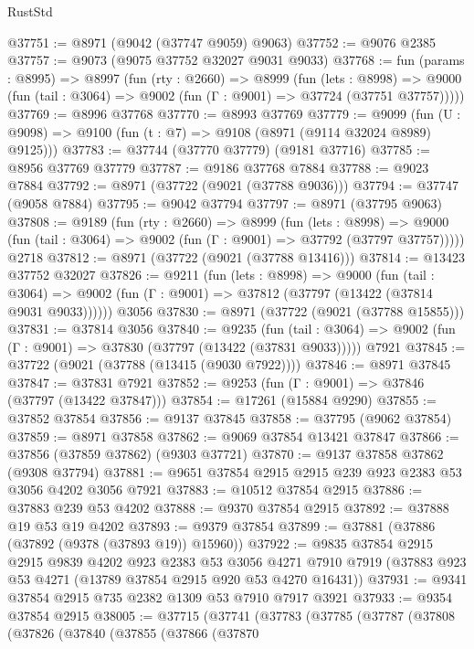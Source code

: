 \begin{lexlean}{RustStd}
\begin{coremodule}
@37751 := @8971 (@9042 (@37747 @9059) @9063)
@37752 := @9076 @2385
@37757 := @9073 (@9075 @37752 @32027 @9031 @9033)
@37768 := fun (params : @8995) =>
  @8997
    (fun (rty : @2660) =>
    @8999
      (fun (lets : @8998) =>
      @9000 (fun (tail : @3064) => @9002 (fun (Γ : @9001) => @37724 (@37751 @37757)))))
@37769 := @8996 @37768
@37770 := @8993 @37769
@37779 := @9099
    (fun (U : @9098) => @9100 (fun (t : @7) => @9108 (@8971 (@9114 @32024 @8989) @9125)))
@37783 := @37744 (@37770 @37779) (@9181 @37716)
@37785 := @8956 @37769 @37779
@37787 := @9186 @37768 @7884
@37788 := @9023 @7884
@37792 := @8971 (@37722 (@9021 (@37788 @9036)))
@37794 := @37747 (@9058 @7884)
@37795 := @9042 @37794
@37797 := @8971 (@37795 @9063)
@37808 := @9189
    (fun (rty : @2660) =>
    @8999
      (fun (lets : @8998) =>
      @9000 (fun (tail : @3064) => @9002 (fun (Γ : @9001) => @37792 (@37797 @37757)))))
    @2718
@37812 := @8971 (@37722 (@9021 (@37788 @13416)))
@37814 := @13423 @37752 @32027
@37826 := @9211
    (fun (lets : @8998) =>
    @9000
      (fun (tail : @3064) =>
      @9002 (fun (Γ : @9001) => @37812 (@37797 (@13422 (@37814 @9031 @9033))))))
    @3056
@37830 := @8971 (@37722 (@9021 (@37788 @15855)))
@37831 := @37814 @3056
@37840 := @9235
    (fun (tail : @3064) => @9002 (fun (Γ : @9001) => @37830 (@37797 (@13422 (@37831 @9033)))))
    @7921
@37845 := @37722 (@9021 (@37788 (@13415 (@9030 @7922))))
@37846 := @8971 @37845
@37847 := @37831 @7921
@37852 := @9253 (fun (Γ : @9001) => @37846 (@37797 (@13422 @37847)))
@37854 := @17261 (@15884 @9290)
@37855 := @37852 @37854
@37856 := @9137 @37845
@37858 := @37795 (@9062 @37854)
@37859 := @8971 @37858
@37862 := @9069 @37854 @13421 @37847
@37866 := @37856 (@37859 @37862) (@9303 @37721)
@37870 := @9137 @37858 @37862 (@9308 @37794)
@37881 := @9651 @37854 @2915 @2915 @239 @923 @2383 @53 @3056 @4202 @3056 @7921
@37883 := @10512 @37854 @2915
@37886 := @37883 @239 @53 @4202
@37888 := @9370 @37854 @2915
@37892 := @37888 @19 @53 @19 @4202
@37893 := @9379 @37854
@37899 := @37881 (@37886 (@37892 (@9378 (@37893 @19)) @15960))
@37922 := @9835
    @37854
    @2915
    @2915
    @9839
    @4202
    @923
    @2383
    @53
    @3056
    @4271
    @7910
    @7919
    (@37883 @923 @53 @4271 (@13789 @37854 @2915 @920 @53 @4270 @16431))
@37931 := @9341 @37854 @2915 @735 @2382 @1309 @53 @7910 @7917 @3921
@37933 := @9354 @37854 @2915
@38005 := @37715
    (@37741
      (@37783
        (@37785
          (@37787
            (@37808
              (@37826
                (@37840
                  (@37855
                    (@37866
                      (@37870

\end{coremodule}
\end{lexlean}
